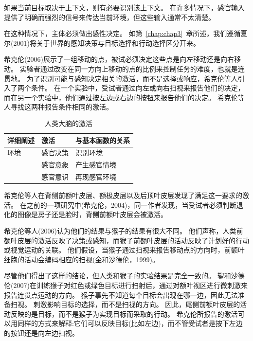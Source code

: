 如果当前目标取决于上下文，则有必要识别该上下文。
在许多情况下，感官输入提供了明确而强烈的信号来传达当前环境，但这些输入通常不太清楚。


在这种情况下，主体必须做出感性决定。
如第~\ref{chap:chap3}~章所述，我们遵循夏尔(2001)将关于世界的感知决策与目标选择和行动选择区分开来。


希克伦(2006)展示了一组移动的点，被试必须决定这些点是向左移动还是向右移动。
实验者通过改变在同一方向上移动的点的比例来控制任务的难度，也就是连贯地。
为了识别可能与感知决定相关的激活，而不是选择或响应，希克伦等人引入了两个条件。
在一个实验中，受试者通过向左或向右扫视来报告他们的决定，而在另一个实验中，他们通过按左边或右边的按钮来报告他们的决定。
希克伦等人寻找这两种报告条件相同的激活。
\par


\begin{table}[htbp] 
	\newcommand{\tabincell}[2]{\begin{tabular}{@{}#1@{}}#2\end{tabular}} %
	\centering
	\caption{人类大脑的激活\label{tab:9_1}}
	\renewcommand\arraystretch{1.5}	%
	\begin{tabular}{lll}
		\toprule
		详细阐述 & 激活 & 与基本函数的关系\\
		\midrule
		 环境& 感官决策 & 识别环境  \\
		 & 感官意象 & 产生感官情境 \\
		&  感官意识 & 再现感官环境\\
				\bottomrule
	
	\end{tabular}%
\end{table}%


希克伦等人在背侧前额叶皮层、额极皮层以及后顶叶皮层发现了满足这一要求的激活。
在之前的一项研究中(希克伦，2004)，同一作者发现，当受试者必须判断退化的图像是房子还是脸时，背侧前额叶皮层会被激活。
\par


希克伦等人(2006)认为他们的结果与猴子的结果有很大不同。
他们声称，人类前额叶皮层的激活反映了决策或感知，而猴子前额叶皮层的活动反映了计划好的行动或视觉运动的关联。
他们假设，当猴子通过扫视来报告移动点的方向时，前额叶细胞的活动会编码相应的扫视(金和沙德伦，1999)。
\par


尽管他们得出了这样的结论，但人类和猴子的实验结果是完全一致的。
鋆和沙德伦(2007)在训练猴子对红色或绿色目标进行扫射后，通过对额叶视区进行微刺激来报告连贯点运动的方向。
猴子事先不知道每个目标会出现在哪一边，因此无法准备扫视。
刺激影响目标的选择，而不是扫视的方向。
因此，尾侧前额叶皮层的活动反映的是目标，而不是猴子为实现目标而采取的行动。
希克伦所报告的激活可以用同样的方式来解释:它们可以反映目标(比如左边)，而不管受试者是按下左边的按钮还是向左边扫视。
\par


